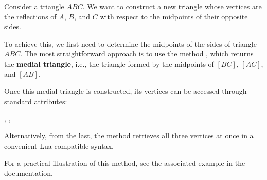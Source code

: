 Consider a triangle $ABC$. We want to construct a new triangle whose vertices are the reflections of $A$, $B$, and $C$ with respect to the midpoints of their opposite sides.

\medskip
\noindent
To achieve this, we first need to determine the midpoints of the sides of triangle $ABC$. The most straightforward approach is to use the method , which returns the \textbf{medial triangle}, i.e., the triangle formed by the midpoints of $[BC]$, $[AC]$, and $[AB]$.

\medskip
\noindent
Once this medial triangle is constructed, its vertices can be accessed through standard attributes:
\begin{center}
, , 
\end{center}

\noindent
Alternatively, from the last, the method  retrieves all three vertices at once in a convenient Lua-compatible syntax.

\medskip
\noindent
For a practical illustration of this method, see  the associated  example in the documentation.

\vspace{1em}

\begin{minipage}{.5\textwidth-2cm}
\begin{center}
\end{center}
\end{minipage}
\begin{minipage}{.5\textwidth}
\begin{tkzexample}
\end{tkzexample}
\end{minipage}

